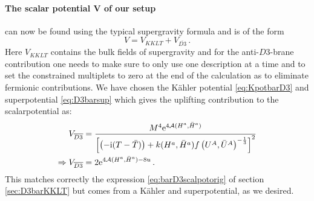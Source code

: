 \documentclass[a4paper,12pt]{report}
\newcommand{\be}{\begin{equation}}
\newcommand{\ee}{\end{equation}}
\newcommand{\bea}{\begin{equation}\begin{aligned}}
\newcommand{\eea}{\end{aligned}\end{equation}}
\def\rmi{{\rm i}}
\def\rme{{\rm e}}
\begin{document}
\paragraph{The scalar potential $\mathbf{V}$ of our setup} can now be found using the typical supergravity formula and is of the form
\be 
V = V_{KKLT} + V_{\overline{D3}}\,.
\ee
Here $V_{KKLT}$ contains the bulk fields of supergravity and for the anti-$D3$-brane contribution one needs to make sure to only use one description at a time and to set the constrained multiplets to zero at the end of the calculation as to eliminate fermionic contributions. We have chosen the Kähler potential \eqref{eq:KpotbarD3} and superpotential \eqref{eq:D3barsup} which gives the uplifting contribution to the scalarpotential as:
\bea
V_{\overline{D3}} &= \frac{M^4 \rme^{4\mathcal{A}(H^a,\bar{H}^a)}}{\left[\left(-\rmi(T-\bar{T})\right) + k(H^a,\bar{H}^a)f\left(U^A,\bar{U}^A\right)^{-\frac{1}{3}}\right]^2}\\
\Rightarrow V_{\overline{D3}} &= 2 \rme^{4\mathcal{A}(H^a,\bar{H}^a)-8u}\,.
\eea
This matches correctly the expression \eqref{eq:barD3scalpotorig} of section \ref{sec:D3barKKLT} but comes from a Kähler and superpotential, as we desired.
\end{document}
